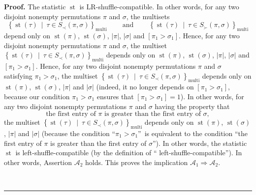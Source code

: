\documentclass[numbers=enddot,12pt,final,onecolumn,notitlepage]{scrartcl}%
\theoremstyle{definition}
\newenvironment{proof}[1][Proof]{\noindent\textbf{#1.} }{\ \rule{0.5em}{0.5em}}
\begin{document}
\begin{proof}
The statistic $\operatorname*{st}$ is LR-shuffle-compatible. In other words,
for any two disjoint nonempty permutations $\pi$ and $\sigma$, the multisets%
\[
\left\{  \operatorname*{st}\left(  \tau\right)  \ \mid\ \tau\in S_{\prec
}\left(  \pi,\sigma\right)  \right\}  _{\operatorname*{multi}}%
\ \ \ \ \ \ \ \ \ \ \text{and}\ \ \ \ \ \ \ \ \ \ \left\{  \operatorname*{st}%
\left(  \tau\right)  \ \mid\ \tau\in S_{\succ}\left(  \pi,\sigma\right)
\right\}  _{\operatorname*{multi}}%
\]
depend only on $\operatorname*{st}\left(  \pi\right)  $, $\operatorname*{st}%
\left(  \sigma\right)  $, $\left\vert \pi\right\vert $, $\left\vert
\sigma\right\vert $ and $\left[  \pi_{1}>\sigma_{1}\right]  $. Hence, for any
two disjoint nonempty permutations $\pi$ and $\sigma$, the multiset $\left\{
\operatorname*{st}\left(  \tau\right)  \ \mid\ \tau\in S_{\prec}\left(
\pi,\sigma\right)  \right\}  _{\operatorname*{multi}}$ depends only on
$\operatorname*{st}\left(  \pi\right)  $, $\operatorname*{st}\left(
\sigma\right)  $, $\left\vert \pi\right\vert $, $\left\vert \sigma\right\vert
$ and $\left[  \pi_{1}>\sigma_{1}\right]  $. Hence, for any two disjoint
nonempty permutations $\pi$ and $\sigma$ satisfying $\pi_{1}>\sigma_{1}$, the
multiset \newline$\left\{  \operatorname*{st}\left(  \tau\right)  \ \mid
\ \tau\in S_{\prec}\left(  \pi,\sigma\right)  \right\}
_{\operatorname*{multi}}$ depends only on $\operatorname*{st}\left(
\pi\right)  $, $\operatorname*{st}\left(  \sigma\right)  $, $\left\vert
\pi\right\vert $ and $\left\vert \sigma\right\vert $ (indeed, it no longer
depends on $\left[  \pi_{1}>\sigma_{1}\right]  $, because our condition
$\pi_{1}>\sigma_{1}$ ensures that $\left[  \pi_{1}>\sigma_{1}\right]  =1$). In
other words, for any two disjoint nonempty permutations $\pi$ and $\sigma$
having the property that%
\[
\text{the first entry of }\pi\text{ is greater than the first entry of }%
\sigma,
\]
the multiset $\left\{  \operatorname*{st}\left(  \tau\right)  \ \mid\ \tau\in
S_{\prec}\left(  \pi,\sigma\right)  \right\}  _{\operatorname*{multi}}$
depends only on $\operatorname*{st}\left(  \pi\right)  $, $\operatorname*{st}%
\left(  \sigma\right)  $, $\left\vert \pi\right\vert $ and $\left\vert
\sigma\right\vert $ (because the condition \textquotedblleft$\pi_{1}%
>\sigma_{1}$\textquotedblright\ is equivalent to the condition
\textquotedblleft the first entry of $\pi$ is greater than the first entry of
$\sigma$\textquotedblright). In other words, the statistic $\operatorname*{st}%
$ is left-shuffle-compatible (by the definition of \textquotedblleft
left-shuffle-compatible\textquotedblright). In other words, Assertion
$\mathcal{A}_{2}$ holds. This proves the implication $\mathcal{A}%
_{1}\Longrightarrow\mathcal{A}_{2}$.


\end{proof}
\end{document}

